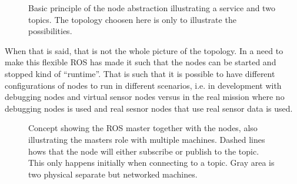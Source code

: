 \begin{figure}[htbp]
	\centering
	
	\caption{Basic principle of the node abstraction illustrating a
	service and two topics. The topology choosen here is only to illustrate
	the possibilities.}
	\label{fig:ros-node-simple-concept}
\end{figure}

When that is said, that is not the whole picture of the topology. In a
need to make this flexible \ac{ROS} has made it such that the nodes
can be started and stopped kind of ``runtime''. That is such that it is
possible to have different configurations of nodes to run in different
scenarios, i.e. in development with debugging nodes and virtual sensor
nodes versus in the real mission where no debugging nodes is used and
real sesnor nodes that use real sensor data is used.

\begin{figure}[htbp]
	\centering
	
	\caption{Concept showing the ROS master together with the nodes,
	also illustrating the masters role with multiple machines. Dashed
	lines hows that the node will either subscribe or publish to the
	topic. This only happens initially when connecting to a topic. Gray
	area is two physical separate but networked machines.}
	\label{fig:ros-node-master-concept}
\end{figure}


